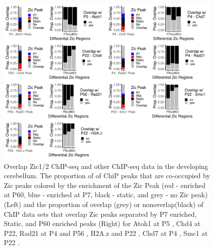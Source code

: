 \documentclass[fleqn,10pt]{wlscirep}
\begin{document}
\begin{figure}[ht]
\centering
\includegraphics[width=.95\textwidth]{../figures/supp_figure_chip_overlap.png }
\caption{Overlap Zic1/2 ChIP-seq and other ChIP-seq data in the developing cerebellum. The proportion of of ChiP peaks that are co-occupied by Zic peaks colored by the enrichment of the Zic Peak (red - enriched at P60, blue - enriched at P7, black - static, and grey - no Zic peak) (Left) and the proportion of overlap (grey) or nonoverlap(black) of ChIP data sets that overlap Zic peaks separated by P7 enriched, Static, and P60 enriched peaks (Right) for Atoh1 at P5 \cite{Klisch2011InDevelopment}, Chd4 at P22\cite{Yang2016ChromatinCoding}, Rad21 at P4 \cite{} and  P56 \cite{Reddy2021CHARGECerebellum}, H2A.z and P22 \cite{Yang2016ChromatinCoding}, Chd7 at P4 \cite{Reddy2021CHARGECerebellum}, Smc1 at P22 \cite{Goodman2020TheBrain}.  }
\label{fig:chip_overlap}
\end{figure}


\end{document}

